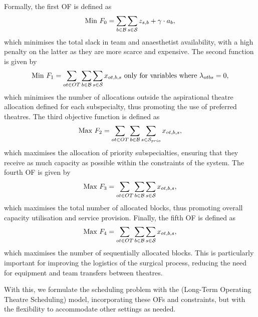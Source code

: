 Formally, the first OF is defined as
\begin{align}
    \text{Min } \displaystyle F_0 = \sum_{b \in \mathcal{B}} \sum_{s \in \mathcal{S}} z_{s,b} + \gamma \cdot a_{b}, \label{eq:f0}
\end{align}
which minimises the total slack in team and anaesthetist availability, with a high penalty on the latter as they are more scarce and expensive.
The second function is given by
\begin{align}
    \text{Min } \displaystyle F_1 = \sum_{ot \in OT} \sum_{b \in \mathcal{B}} \sum_{s \in \mathcal{S}} x_{ot,b,s}  \text{ only for variables where } \lambda_{otbs} = 0, \label{eq:f1}
\end{align}
which minimises the number of allocations outside the aspirational theatre allocation defined for each subspecialty, thus promoting the use of preferred theatres.
The third objective function is defined as
\begin{align}
    \text{Max } \displaystyle F_2 = \sum_{ot \in OT} \sum_{b \in \mathcal{B}} \sum_{s \in \mathcal{S}_{prio}} x_{ot,b,s}, \label{eq:f2}
\end{align}
which maximises the allocation of priority subspecialties, ensuring that they receive as much capacity as possible within the constraints of the system.
The fourth OF is given by
\begin{align}
\text{Max } \displaystyle F_3 = \sum_{ot \in OT} \sum_{b \in \mathcal{B}} \sum_{s \in \mathcal{S}} x_{ot,b,s}, \label{eq:f3}
\end{align}
which maximises the total number of allocated blocks, thus promoting overall capacity utilisation and service provision.
Finally, the fifth OF is defined as
\begin{align}
    \text{Max } \displaystyle F_4 = \sum_{ot \in OT} \sum_{b \in \mathcal{B}} \sum_{s \in \mathcal{S}} x_{ot,b,s}, \label{eq:f4}
\end{align}
which maximises the number of sequentially allocated blocks.
This is particularly important for improving the logistics of the surgical process, reducing the need for equipment and team transfers between theatres.

With this, we formulate the scheduling problem with the \modelname (Long-Term Operating Theatre Scheduling) model, incorporating these OFs and constraints, but with the flexibility to accommodate other settings as needed.

